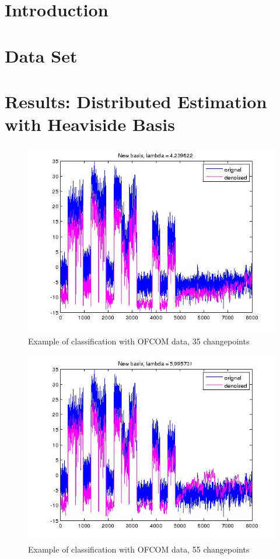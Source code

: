 \section{Introduction}

\section{Data Set}

\section{Results: Distributed Estimation with Heaviside Basis}

\begin{figure}[h]
\centering
\includegraphics[height = 7.3 cm]{new_basis_ofcom_1.jpg}
\caption{Example of classification with OFCOM data, 35 changepoints}
\label{fig:hvb}
\end{figure}

\begin{figure}[h]
\centering
\includegraphics[height = 7.3 cm]{new_basis_ofcom_2.jpg}
\caption{Example of classification with OFCOM data, 55 changepoints}
\label{fig:hvb}
\end{figure}

